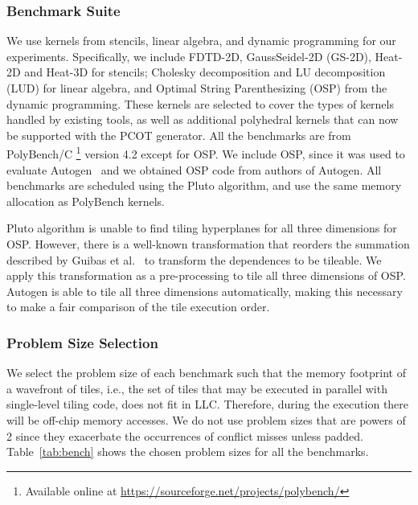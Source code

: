 \subsubsection{Benchmark Suite}
We use kernels from stencils, linear algebra, and dynamic programming for our
experiments.  Specifically, we include FDTD-2D, GaussSeidel-2D (GS-2D),
Heat-2D and Heat-3D for stencils; Cholesky decomposition and LU decomposition
(LUD) for linear algebra, and Optimal String Parenthesizing (OSP) from the
dynamic programming.  
%
These kernels are selected to cover the types of kernels handled by existing
tools, as well as additional polyhedral kernels that can now be supported with
the PCOT generator.  All the benchmarks are from PolyBench/C
\footnote{Available online at
\url{https://sourceforge.net/projects/polybench/}} version 4.2 except for OSP.
We include OSP, since it was used to evaluate Autogen~\cite{autogen-ppopp16}
and we obtained OSP code from authors of Autogen.
%
All benchmarks are scheduled using the Pluto algorithm, and use the same
memory allocation as PolyBench kernels.  

Pluto algorithm is unable to find tiling hyperplanes for all three dimensions
for OSP. However, there is a well-known transformation that reorders the
summation described by Guibas et al.~\cite{guibas-kung-thompson} to transform
the dependences to be tileable.  We apply this transformation as a
pre-processing to tile all three dimensions of OSP. Autogen is able to tile all
three dimensions automatically,
making this necessary to make a fair comparison of the tile execution order.

\subsubsection{Problem Size Selection}
We select the problem size of each benchmark such that the memory footprint of
a wavefront of tiles, i.e., the set of tiles that may be executed in parallel
with single-level tiling code, does not fit in LLC. Therefore, during the
execution there will be off-chip memory accesses. We do not use problem sizes
that are  powers of 2 since they exacerbate the occurrences of conflict misses
unless padded.  Table~\ref{tab:bench} shows the chosen problem sizes for all
the benchmarks.


